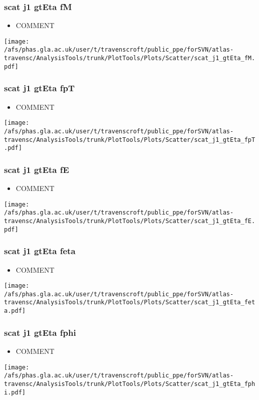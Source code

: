 \documentclass{beamer}
\begin{document}
\begin{frame}
\frametitle{scat j1 gtEta fM}
\begin{itemize}
\item COMMENT
\end{itemize}
\begin{center}
\texttt{[image: /afs/phas.gla.ac.uk/user/t/travenscroft/public\_ppe/forSVN/atlas-travensc/AnalysisTools/trunk/PlotTools/Plots/Scatter/scat\_j1\_gtEta\_fM.pdf]}
\end{center}
\end{frame}

\begin{frame}
\frametitle{scat j1 gtEta fpT}
\begin{itemize}
\item COMMENT
\end{itemize}
\begin{center}
\texttt{[image: /afs/phas.gla.ac.uk/user/t/travenscroft/public\_ppe/forSVN/atlas-travensc/AnalysisTools/trunk/PlotTools/Plots/Scatter/scat\_j1\_gtEta\_fpT.pdf]}
\end{center}
\end{frame}

\begin{frame}
\frametitle{scat j1 gtEta fE}
\begin{itemize}
\item COMMENT
\end{itemize}
\begin{center}
\texttt{[image: /afs/phas.gla.ac.uk/user/t/travenscroft/public\_ppe/forSVN/atlas-travensc/AnalysisTools/trunk/PlotTools/Plots/Scatter/scat\_j1\_gtEta\_fE.pdf]}
\end{center}
\end{frame}

\begin{frame}
\frametitle{scat j1 gtEta feta}
\begin{itemize}
\item COMMENT
\end{itemize}
\begin{center}
\texttt{[image: /afs/phas.gla.ac.uk/user/t/travenscroft/public\_ppe/forSVN/atlas-travensc/AnalysisTools/trunk/PlotTools/Plots/Scatter/scat\_j1\_gtEta\_feta.pdf]}
\end{center}
\end{frame}

\begin{frame}
\frametitle{scat j1 gtEta fphi}
\begin{itemize}
\item COMMENT
\end{itemize}
\begin{center}
\texttt{[image: /afs/phas.gla.ac.uk/user/t/travenscroft/public\_ppe/forSVN/atlas-travensc/AnalysisTools/trunk/PlotTools/Plots/Scatter/scat\_j1\_gtEta\_fphi.pdf]}
\end{center}
\end{frame}
\end{document}
